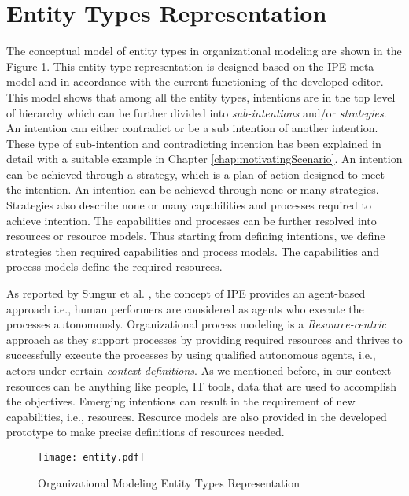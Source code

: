 \section{Entity Types Representation}
\label{sec:entitytypesrepresentation}
The conceptual model of entity types in organizational modeling are shown in the Figure \ref{fig:entitymodel}. This entity type representation is designed based on the IPE meta-model \cite{Sungur2014a} and in accordance with the current functioning of the developed editor. This model shows that among all the entity types, intentions are in the top level of hierarchy which can be further divided into \textit{sub-intentions} and/or \textit{strategies}. An intention can either contradict or be a sub intention of another intention. These type of sub-intention and contradicting intention has been explained in detail with a suitable example in Chapter \ref{chap:motivatingScenario}.  An intention can be achieved through a strategy, which is a plan of action designed to meet the intention. An intention can be achieved through none or many strategies. Strategies also describe none or many capabilities and processes required to achieve intention. The capabilities and processes can be further resolved into resources or resource models. Thus starting from defining intentions, we define strategies then required capabilities and process models. The capabilities and process models define the required resources. 

As reported by Sungur et al. \cite{Sungur2014a}, the concept of IPE provides an agent-based approach i.e., human performers are considered as agents who execute the processes autonomously. Organizational process modeling is a \textit{Resource-centric} approach as they support processes by providing required resources and thrives to successfully execute the processes by using qualified autonomous agents, i.e., actors under certain \textit{context definitions}.  As we mentioned before, in our context resources can be anything like people, IT tools, data that are used to accomplish the objectives. Emerging intentions can result in the requirement of new capabilities, i.e., resources. Resource models are also provided in the developed prototype to make precise definitions of resources needed.

\begin{figure}
	\centering
	\texttt{[image: entity.pdf]}
	\caption{Organizational Modeling Entity Types Representation}
	\label{fig:entitymodel}
\end{figure}

